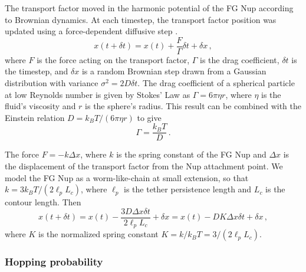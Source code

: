 The transport factor moved in the harmonic potential of the FG Nup according to Brownian dynamics. At each timestep, the transport factor position was updated using a force-dependent diffusive step \cite{blackwell17}.
\begin{equation}
  x(t+\delta t) = x(t) + \frac{F}{\Gamma} \delta t + \delta x\,,
\end{equation} 
where $F$ is the force acting on the transport factor, $\Gamma$ is the drag coefficient, $\delta t$ is the timestep, and $\delta x$ is a random Brownian step drawn from a Gaussian distribution with variance $\sigma^2 = 2 D \delta t$. The drag coefficient of a spherical particle at low Reynolds number is given by Stokes' Law as $\Gamma = 6 \pi \eta r$, where $\eta$ is the fluid's viscosity and $r$ is the sphere's radius.  This result can be combined with the Einstein relation $D = k_B T / (6\pi \eta r)$ to give
\begin{equation}
\Gamma= \frac{k_B T}{D}\,.
\end{equation}
 
The force $F = -k\Delta x$, where $k$ is the spring constant of the FG Nup and $\Delta x$ is the displacement of the transport factor from the Nup attachment point.  We model the FG Nup as a worm-like-chain at small extension, so that $k = 3 k_B T/(2\ell_pL_c)$, where $\ell_p$ is the tether persistence length and $L_c$ is the contour length.  Then 
\begin{equation}
  x(t+\delta t) = x(t) - \frac{3 D \Delta x \delta t}{2\ell_p L_c }+
  \delta x = x(t) - D K \Delta x \delta t+ \delta x\,,
\end{equation}
where $K$ is the normalized spring constant $K = k/k_B T = 3/(2 \ell_p L_c)$.

\subsubsection{Hopping probability}

